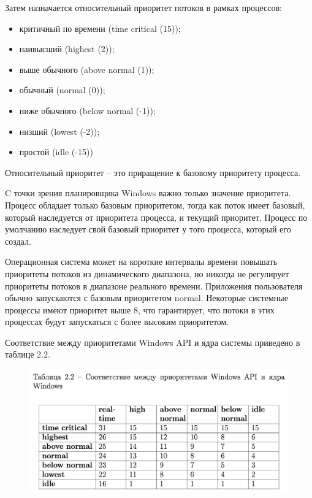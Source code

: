 Затем назначается относительный приоритет потоков в рамках процессов:

\begin{itemize}
	\item критичный по времени (time critical (15));
	\item наивысший (highest (2));
	\item выше обычного (above normal (1));
	\item  обычный (normal (0));
	\item ниже обычного (below normal (-1));
	\item низший (lowest (-2));
	\item простой (idle (-15))
\end{itemize}

Относительный приоритет -- это приращение к базовому приоритету процесса.

C точки зрения планировщика Windows важно только значение приоритета. Процесс обладает только базовым приоритетом, тогда как поток имеет базовый, который наследуется от приоритета процесса, и текущий приоритет. Процесс по умолчанию наследует свой базовый приоритет у того процесса, который его создал.

Операционная система может на короткие интервалы времени повышать приоритеты потоков из динамического диапазона, но никогда не регулирует приоритеты потоков в диапазоне реального времени. Приложения пользователя обычно запускаются с базовым приоритетом normal. Некоторые системные процессы имеют приоритет выше 8, что гарантирует, что потоки в этих процессах будут запускаться с более высоким приоритетом.

Соответствие между приоритетами Windows API и ядра системы приведено в таблице 2.2.

\begin{figure}[h!]
	\centering
	\includegraphics[scale=1.0, width=1.0\textwidth]{assets/table-2}
\end{figure}

